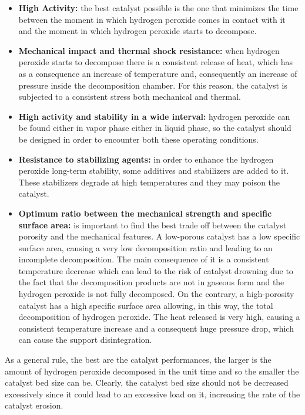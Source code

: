 \documentclass[a4paper]{report}
\begin{document}
\begin{itemize}
\item \textbf{High Activity:} the best catalyst possible is the one that minimizes the time between the moment in which hydrogen peroxide comes in contact with it and the moment in which hydrogen peroxide starts to decompose. \\
\item \textbf{Mechanical impact and thermal shock resistance:} when hydrogen peroxide starts to decompose there is a consistent release of heat, which has as a consequence an increase of temperature and, consequently an increase of pressure inside the decomposition chamber. For this reason, the catalyst is subjected to a consistent stress both mechanical and thermal.\\
\item \textbf{High activity and stability in a wide interval:} hydrogen peroxide can be found either in vapor phase either in liquid phase, so the catalyst should be designed in order to encounter both these operating conditions.\\
\item \textbf{Resistance to stabilizing agents:} in order to enhance the hydrogen peroxide long-term stability, some additives and stabilizers are added to it. These stabilizers degrade at high temperatures and they may poison the catalyst.\\
\item \textbf{Optimum ratio between the mechanical strength and specific surface area:} is important to find the best trade off between the catalyst porosity and the mechanical features. A low-porous catalyst has a low specific surface area, causing a very low decomposition ratio and leading to an incomplete decomposition. The main consequence of it is a consistent temperature decrease which can lead to the risk of catalyst drowning due to the fact that the decomposition products are not in gaseous form and the hydrogen peroxide is not fully decomposed. On the contrary, a high-porosity catalyst has a high specific surface area allowing, in this way, the total decomposition of hydrogen peroxide. The heat released is very high, causing a consistent temperature increase and a consequent huge pressure drop, which can cause the support disintegration. 
\end{itemize}

As a general rule, the best are the catalyst performances, the larger is the amount of hydrogen peroxide decomposed in the unit time and so the smaller the catalyst bed size can be. Clearly, the catalyst bed size should not be decreased excessively since it could lead to an excessive load on it, increasing the rate of the catalyst erosion. \\
\end{document}
